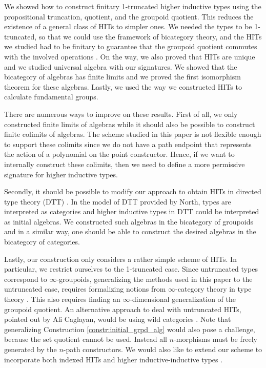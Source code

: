 We showed how to construct finitary 1-truncated higher inductive types using the propositional truncation, quotient, and the groupoid quotient.
This reduces the existence of a general class of HITs to simpler ones.
We needed the types to be 1-truncated, so that we could use the framework of bicategory theory,
and the HITs we studied had to be finitary to guarantee that the groupoid quotient
commutes with the involved operations \cite{DBLP:journals/mscs/ChapmanUV19}.
On the way, we also proved that HITs are unique and we studied universal algebra with our signatures.
We showed that the bicategory of algebras has finite limits and we proved the first isomorphism theorem for these algebras.
Lastly, we used the way we constructed HITs to calculate fundamental groups.

There are numerous ways to improve on these results.
First of all, we only constructed finite limits of algebras while it should also be possible to construct finite colimits of algebras.
The scheme studied in this paper is not flexible enough to support these colimits since we do not have a path endpoint that represents the action of a polynomial on the point constructor.
Hence, if we want to internally construct these colimits, then we need to define a more permissive signature for higher inductive types.

Secondly, it should be possible to modify our approach to obtain HITs in directed type theory (DTT) \cite{north2019towards}.
In the model of DTT provided by North, types are interpreted as categories and higher inductive types in DTT could be interpreted as initial algebras.
We constructed such algebras in the bicategory of groupoids and in a similar way, one should be able to construct the desired algebras in the bicategory of categories.

Lastly, our construction only considers a rather simple scheme of HITs.
In particular, we restrict ourselves to the 1-truncated case. %
Since untruncated types correspond to $\infty$-groupoids,
generalizing the methods used in this paper to the untruncated case,
requires formalizing notions from $\infty$-category theory in type theory
\cite{DBLP:conf/csl/AltenkirchR12,DBLP:journals/pacmpl/CapriottiK18,FinsterM17}.
This also requires finding an $\infty$-dimensional generalization of the groupoid quotient.
An alternative approach to deal with untruncated HITs, pointed out by Ali Caglayan,
would be using wild categories \cite{DBLP:conf/tlca/HirschowitzHT15,KrausRaumer}.
Note that generalizing Construction \ref{constr:initial_grpd_alg} would also pose a challenge, because the set quotient cannot be used.
Instead all $n$-morphisms must be freely generated by the $n$-path constructors.
We would also like to extend our scheme to incorporate both indexed HITs and higher inductive-inductive types \cite{CavalloH19,KaposiK18}.
